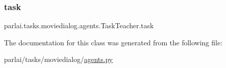\subsubsection{\texorpdfstring{task}{task}}
{\footnotesize\ttfamily parlai.\+tasks.\+moviedialog.\+agents.\+Task\+Teacher.\+task}



The documentation for this class was generated from the following file\+:\begin{DoxyCompactItemize}
\item 
parlai/tasks/moviedialog/\hyperlink{parlai_2tasks_2moviedialog_2agents_8py}{agents.\+py}\end{DoxyCompactItemize}
